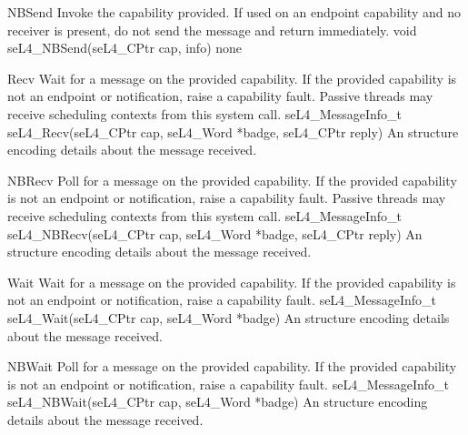 {NBSend}
{Invoke the capability provided. If used on an endpoint capability and no receiver is present, do
    not send the message and return immediately.}
{void seL4\_NBSend(seL4\_CPtr cap,  info)}
{
}
{none}

{Recv}
{Wait for a message on the provided capability. If the provided capability is not an endpoint or
    notification, raise a capability fault. Passive threads may receive scheduling contexts from 
this system call.}
    {seL4\_MessageInfo\_t seL4\_Recv(seL4\_CPtr cap, seL4\_Word *badge, seL4\_CPtr reply)}
{
}
{An  structure encoding details about the message received.}


{NBRecv}
{Poll for a message on the provided capability. If the provided capability is not an endpoint or
    notification, raise a capability fault. Passive threads may receive scheduling contexts from 
this system call.}
    {seL4\_MessageInfo\_t seL4\_NBRecv(seL4\_CPtr cap, seL4\_Word *badge, seL4\_CPtr reply)}
{
}
{An  structure encoding details about the message received.}

{Wait}
{Wait for a message on the provided capability. If the provided capability is not an endpoint or
    notification, raise a capability fault.}
    {seL4\_MessageInfo\_t seL4\_Wait(seL4\_CPtr cap, seL4\_Word *badge)}
{
}
{An  structure encoding details about the message received.}

{NBWait}
{Poll for a message on the provided capability. If the provided capability is not an endpoint or
    notification, raise a capability fault.}
    {seL4\_MessageInfo\_t seL4\_NBWait(seL4\_CPtr cap, seL4\_Word *badge)}
{
}
{An  structure encoding details about the message received.}

